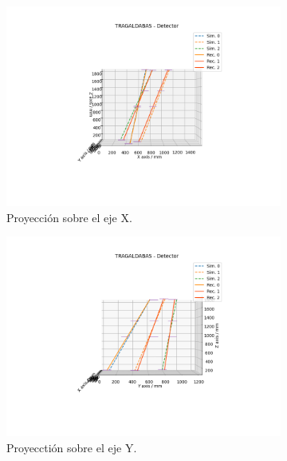 \documentclass[a4paper]{article}
\begin{document}
\begin{figure}[H] 
  \begin{subfigure}[b]{0.5\linewidth}
    \centering
    \includegraphics[trim={4cm 3cm 3.9cm 1.9cm},clip,width=\linewidth]  {tragaldabas_xproj.png} 
    \caption{Proyección sobre el eje X.} 
    \label{fg:3-a} 
  \end{subfigure}%
  \begin{subfigure}[b]{0.5\linewidth}
    \centering
    \includegraphics[trim={4cm 3cm 3.9cm 1.9cm},clip,width=\linewidth]  {tragaldabas_yproj.png} 
    \caption{Proyecctión sobre el eje Y.} 
    \label{fg:3-b} 
  \end{subfigure} 
  \begin{subfigure}[b]{0.5\linewidth}

\end{subfigure}
\end{figure}
\end{document}
